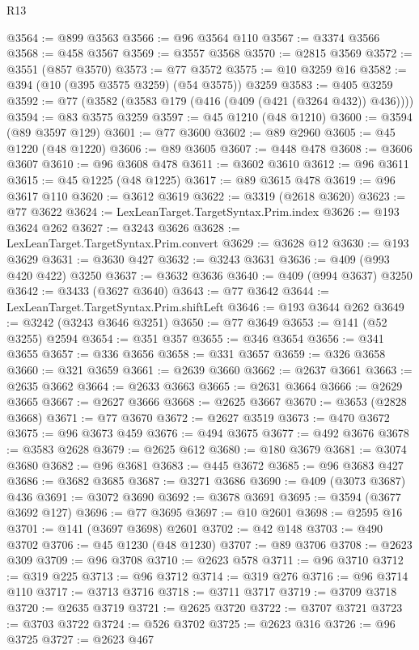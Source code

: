 \begin{lexlean}{R13}
\begin{coremodule}
@3564 := @899 @3563
@3566 := @96 @3564 @110
@3567 := @3374 @3566
@3568 := @458 @3567
@3569 := @3557 @3568
@3570 := @2815 @3569
@3572 := @3551 (@857 @3570)
@3573 := @77 @3572
@3575 := @10 @3259 @16
@3582 := @394 (@10 (@395 @3575 @3259) (@54 @3575)) @3259
@3583 := @405 @3259
@3592 := @77 (@3582 (@3583 @179 (@416 (@409 (@421 (@3264 @432)) @436))))
@3594 := @83 @3575 @3259
@3597 := @45 @1210 (@48 @1210)
@3600 := @3594 (@89 @3597 @129)
@3601 := @77 @3600
@3602 := @89 @2960
@3605 := @45 @1220 (@48 @1220)
@3606 := @89 @3605
@3607 := @448 @478
@3608 := @3606 @3607
@3610 := @96 @3608 @478
@3611 := @3602 @3610
@3612 := @96 @3611
@3615 := @45 @1225 (@48 @1225)
@3617 := @89 @3615 @478
@3619 := @96 @3617 @110
@3620 := @3612 @3619
@3622 := @3319 (@2618 @3620)
@3623 := @77 @3622
@3624 := LexLeanTarget.TargetSyntax.Prim.index
@3626 := @193 @3624 @262
@3627 := @3243 @3626
@3628 := LexLeanTarget.TargetSyntax.Prim.convert
@3629 := @3628 @12
@3630 := @193 @3629
@3631 := @3630 @427
@3632 := @3243 @3631
@3636 := @409 (@993 @420 @422) @3250
@3637 := @3632 @3636
@3640 := @409 (@994 @3637) @3250
@3642 := @3433 (@3627 @3640)
@3643 := @77 @3642
@3644 := LexLeanTarget.TargetSyntax.Prim.shiftLeft
@3646 := @193 @3644 @262
@3649 := @3242 (@3243 @3646 @3251)
@3650 := @77 @3649
@3653 := @141 (@52 @3255) @2594
@3654 := @351 @357
@3655 := @346 @3654
@3656 := @341 @3655
@3657 := @336 @3656
@3658 := @331 @3657
@3659 := @326 @3658
@3660 := @321 @3659
@3661 := @2639 @3660
@3662 := @2637 @3661
@3663 := @2635 @3662
@3664 := @2633 @3663
@3665 := @2631 @3664
@3666 := @2629 @3665
@3667 := @2627 @3666
@3668 := @2625 @3667
@3670 := @3653 (@2828 @3668)
@3671 := @77 @3670
@3672 := @2627 @3519
@3673 := @470 @3672
@3675 := @96 @3673 @459
@3676 := @494 @3675
@3677 := @492 @3676
@3678 := @3583 @2628
@3679 := @2625 @612
@3680 := @180 @3679
@3681 := @3074 @3680
@3682 := @96 @3681
@3683 := @445 @3672
@3685 := @96 @3683 @427
@3686 := @3682 @3685
@3687 := @3271 @3686
@3690 := @409 (@3073 @3687) @436
@3691 := @3072 @3690
@3692 := @3678 @3691
@3695 := @3594 (@3677 @3692 @127)
@3696 := @77 @3695
@3697 := @10 @2601
@3698 := @2595 @16
@3701 := @141 (@3697 @3698) @2601
@3702 := @42 @148
@3703 := @490 @3702
@3706 := @45 @1230 (@48 @1230)
@3707 := @89 @3706
@3708 := @2623 @309
@3709 := @96 @3708
@3710 := @2623 @578
@3711 := @96 @3710
@3712 := @319 @225
@3713 := @96 @3712
@3714 := @319 @276
@3716 := @96 @3714 @110
@3717 := @3713 @3716
@3718 := @3711 @3717
@3719 := @3709 @3718
@3720 := @2635 @3719
@3721 := @2625 @3720
@3722 := @3707 @3721
@3723 := @3703 @3722
@3724 := @526 @3702
@3725 := @2623 @316
@3726 := @96 @3725
@3727 := @2623 @467

\end{coremodule}
\end{lexlean}
